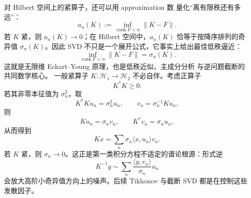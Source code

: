 对 Hilbert 空间上的紧算子，还可以用 approximation 数 量化“离有限秩还有多远”：
\[
a_n(K)
:=
\inf_{\operatorname{rank}F<n}\|K-F\|.
\]
若 $K$ 紧，则 $a_n(K)\to0$；在 Hilbert 空间中，$a_n(K)$ 恰等于按降序排列的奇异值 $\sigma_n(K)$。因此 SVD 不只是一个展开公式，它事实上给出最佳低秩逼近：
\begin{equation*}\inf_{\operatorname{rank}F<n}\|K-F\|
=\sigma_n(K).\end{equation*}
这就是无限维 Eckart--Young 原理，也是低秩近似、主成分分析 与逆问题截断的共同数学核心。
一般紧算子 $K:\mathcal H_1\to\mathcal H_2$ 不必自伴。考虑正算子
\[
K^*K\ge0.
\]
若其非零本征值为 $\sigma_n^2$，取
\[
K^*Ku_n=\sigma_n^2u_n,
\qquad
v_n=\sigma_n^{-1}Ku_n,
\]
则
\[
Ku_n=\sigma_nv_n,
\qquad
K^*v_n=\sigma_nu_n,
\]
从而得到
\[
\boxed{Kx=\sum_n\sigma_n\langle x,u_n\rangle v_n}.
\]
若 $K$ 紧，则 $\sigma_n\to0$。这正是第一类积分方程不适定的谱论根源：形式逆
\[
K^{-1}y\sim\sum_n\frac{\langle y,v_n\rangle}{\sigma_n}u_n
\]
会放大高阶小奇异值方向上的噪声。后续 Tikhonov 与截断 SVD 都是在控制这些发散因子。


